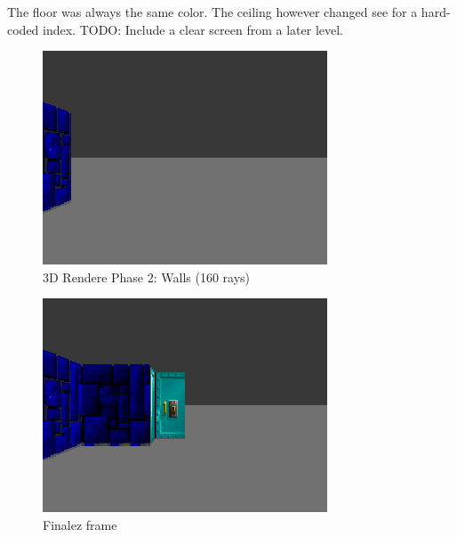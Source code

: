 \par
\begin{minipage}{\textwidth}
 
 \end{minipage}
\par
 


The floor was always the same color. The ceiling however changed see  for a hard-coded index. TODO: Include a clear screen from a later level.\\
\begin{figure}[H]
 \centering
  \includegraphics[width=\textwidth]{screenshots/wolf3d_4_partial_wall_32rays.png}
  \caption{3D Rendere Phase 2: Walls (160 rays)}
 
\end{figure}
 
\begin{figure}[H]
 \centering
  \includegraphics[width=\textwidth]{screenshots/wolf3d_5_partialwalls_160rays.png}
 \caption{Finalez frame} 
 
\end{figure}
 
